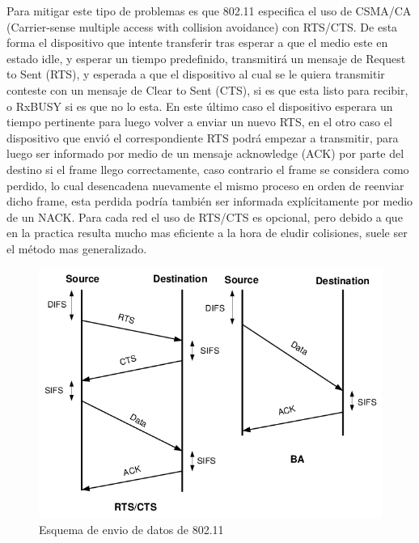 \documentclass[10pt,a4paper]{article}
\begin{document}
Para mitigar este tipo de problemas es que 802.11 especifica el uso de CSMA/CA (Carrier-sense multiple access with collision avoidance) con RTS/CTS. De esta forma el dispositivo que intente transferir tras esperar a que el medio este en estado idle, y esperar un tiempo predefinido, transmitirá un mensaje de Request to Sent (RTS), y esperada a que el dispositivo al cual se le quiera transmitir conteste con un mensaje de Clear to Sent (CTS), si es que esta listo para recibir, o RxBUSY si es que no lo esta. En este último caso el dispositivo esperara un tiempo pertinente para luego volver a enviar un nuevo RTS, en el otro caso el dispositivo que envió el correspondiente RTS podrá empezar a transmitir, para luego ser informado por medio de un mensaje acknowledge (ACK) por parte del destino si el frame llego correctamente, caso contrario el frame se considera como perdido, lo cual desencadena nuevamente el mismo proceso en orden de reenviar dicho frame, esta perdida podría también ser informada explícitamente por medio de un NACK. Para cada red el uso de RTS/CTS es opcional, pero debido a que en la practica resulta mucho mas eficiente a la hora de eludir colisiones, suele ser el método mas generalizado. 

\begin{figure}[H]
\centerline{\includegraphics[scale=0.5]{images/BA_and_RTSCTS_methods_handshake.jpg}}
\caption{Esquema de envio de datos de 802.11}
\end{figure}
\end{document}
